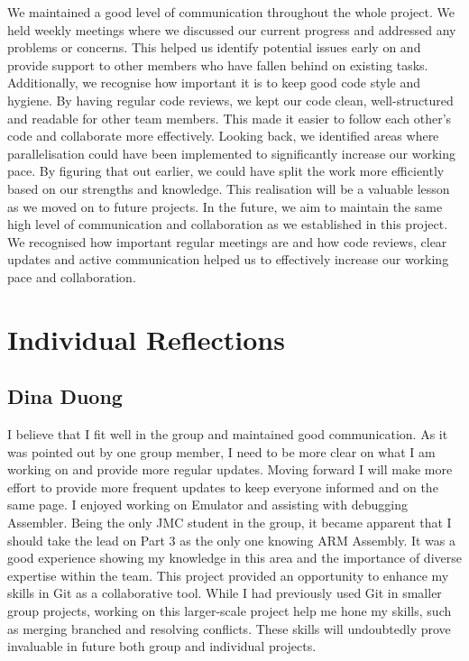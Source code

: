 \documentclass[11pt]{article}
\begin{document}
We maintained a good level of communication throughout the whole project. We held weekly meetings where we discussed
our current progress and addressed any problems or concerns. This helped us identify potential issues early on 
and provide support to other members who have fallen behind on existing tasks. 
\newline 
Additionally, we recognise how important it is to keep good code style and hygiene. By having regular code reviews,
we kept our code clean, well-structured and readable for other team members. This made it easier to follow each other's code and 
collaborate more effectively. 
\newline
Looking back, we identified areas where parallelisation could have been implemented to significantly increase our working pace. 
By figuring that out earlier, we could have split the work more efficiently based on our strengths and knowledge.
This realisation will be a valuable lesson as we moved on to future projects.
\newline
In the future, we aim to maintain the same high level of communication and collaboration as we established in this project.
We recognised how important regular meetings are and how code reviews, clear updates and active communication helped us 
to effectively increase our working pace and collaboration.

\section{Individual Reflections}

\subsection{Dina Duong}

I believe that I fit well in the group and maintained good communication. 
As it was pointed out by one group member, I need to be more clear on what I am working on and provide more regular updates. 
Moving forward I will make more effort to provide more frequent updates to keep everyone informed and on the same page.
\newline
I enjoyed working on Emulator and assisting with debugging Assembler. Being the only JMC student in the group,
it became apparent that I should take the lead on Part 3 as the only one knowing ARM Assembly.
It was a good experience showing my knowledge in this area and the importance of diverse expertise within the team.
\newline
This project provided an opportunity to enhance my skills in Git as a collaborative tool. While I had previously used Git in 
smaller group projects, working on this larger-scale project help me hone my skills, such as merging branched and resolving conflicts.
These skills will undoubtedly prove invaluable in future both group and individual projects.
\end{document}
